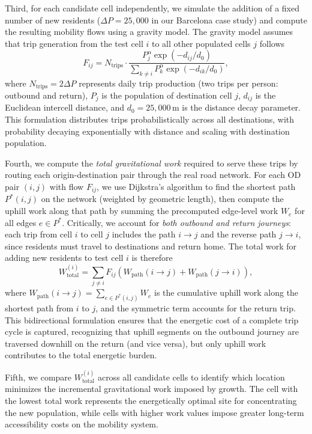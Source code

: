 \documentclass[twocolumn,amsmath,amssymb,floatfix,nature,shownopacs,footinbib,superscriptaddress]{revtex4-1} %
\begin{document}
Third, for each candidate cell independently, we simulate the addition of a fixed number of new residents ($\Delta P = 25{,}000$ in our Barcelona case study) and compute the resulting mobility flows using a gravity model.  
The gravity model assumes that trip generation from the test cell $i$ to all other populated cells $j$ follows
\[
F_{ij} = N_{\text{trips}} \cdot \frac{P_j^\alpha \exp(-d_{ij}/d_0)}{\sum_{k \neq i} P_k^\alpha \exp(-d_{ik}/d_0)},
\]
where $N_{\text{trips}} = 2 \Delta P$ represents daily trip production (two trips per person: outbound and return), $P_j$ is the population of destination cell $j$, $d_{ij}$ is the Euclidean intercell distance, and $d_0 = 25{,}000$\,m is the distance decay parameter.  
This formulation distributes trips probabilistically across all destinations, with probability decaying exponentially with distance and scaling with destination population.

Fourth, we compute the \emph{total gravitational work} required to serve these trips by routing each origin-destination pair through the real road network.  
For each OD pair $(i,j)$ with flow $F_{ij}$, we use Dijkstra's algorithm to find the shortest path $P^*(i,j)$ on the network (weighted by geometric length), then compute the uphill work along that path by summing the precomputed edge-level work $W_e$ for all edges $e \in P^*$.  
Critically, we account for \emph{both outbound and return journeys}: each trip from cell $i$ to cell $j$ includes the path $i \to j$ and the reverse path $j \to i$, since residents must travel to destinations and return home.  
The total work for adding new residents to test cell $i$ is therefore
\[
W_{\text{total}}^{(i)} = \sum_{j \neq i} F_{ij} \left( W_{\text{path}}(i \to j) + W_{\text{path}}(j \to i) \right),
\]
where $W_{\text{path}}(i \to j) = \sum_{e \in P^*(i,j)} W_e$ is the cumulative uphill work along the shortest path from $i$ to $j$, and the symmetric term accounts for the return trip.  
This bidirectional formulation ensures that the energetic cost of a complete trip cycle is captured, recognizing that uphill segments on the outbound journey are traversed downhill on the return (and vice versa), but only uphill work contributes to the total energetic burden.

Fifth, we compare $W_{\text{total}}^{(i)}$ across all candidate cells to identify which location minimizes the incremental gravitational work imposed by growth.  
The cell with the lowest total work represents the energetically optimal site for concentrating the new population, while cells with higher work values impose greater long-term accessibility costs on the mobility system.
\end{document}
